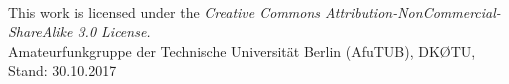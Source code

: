 

\begin{frame}
	\date{}
    \titlepage
    \vfill
    \begin{center}
        \ccbyncsaeu\\
        {\tiny This work is licensed under the \em{Creative Commons Attribution-NonCommercial-ShareAlike 3.0 License}.}\\[0.5ex]
         \tiny Amateurfunkgruppe der Technische Universität Berlin (AfuTUB), DKØTU, Stand: 30.10.2017
    \end{center}
\end{frame}
